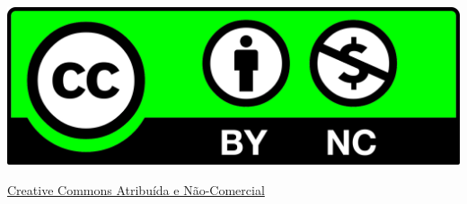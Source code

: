 \begin{center}
	\includegraphics[width=\linewidth]{./IMG-GIT/Cc_by-nc_icon.svg.png}


\href{https://creativecommons.org}{\Huge Creative Commons Atribuída e Não-Comercial}

\end{center}
\vfill\null
\pagebreak